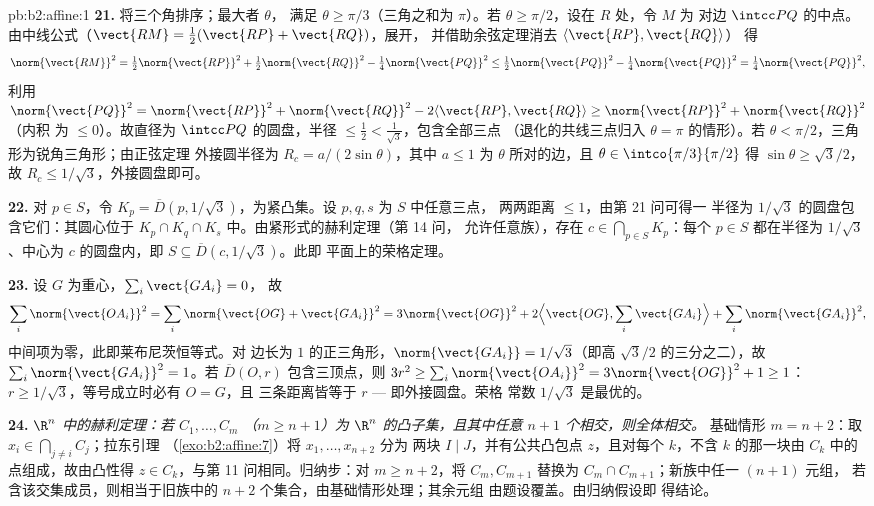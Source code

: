 \begin{solution}{pb:b2:affine:1}
\textbf{21.} 将三个角排序；最大者 $\theta$，
满足 $\theta \geq \pi/3$（三角之和为 $\pi$）。若
$\theta \geq \pi/2$，设在 $R$ 处，令 $M$ 为
对边 $\intcc PQ$ 的中点。由中线公式（$\vect{RM}
= \tfrac12(\vect{RP} + \vect{RQ})$，展开，
并借助余弦定理消去 $\langle\vect{RP}, \vect{RQ}\rangle$）
得
\[
\norm{\vect{RM}}^2 = \tfrac12\norm{\vect{RP}}^2 +
\tfrac12\norm{\vect{RQ}}^2 - \tfrac14\norm{\vect{PQ}}^2 \leq
\tfrac12\norm{\vect{PQ}}^2 - \tfrac14\norm{\vect{PQ}}^2 =
\tfrac14\norm{\vect{PQ}}^2,
\]
利用 $\norm{\vect{PQ}}^2 = \norm{\vect{RP}}^2 +
\norm{\vect{RQ}}^2 - 2\langle\vect{RP}, \vect{RQ}\rangle \geq
\norm{\vect{RP}}^2 + \norm{\vect{RQ}}^2$（内积
为 $\leq 0$）。故直径为 $\intcc PQ$ 的圆盘，半径
$\leq \tfrac12 < \tfrac1{\sqrt3}$，包含全部三点
（退化的共线三点归入 $\theta = \pi$ 的情形）。若
$\theta < \pi/2$，三角形为锐角三角形；由正弦定理
外接圆半径为 $R_c = a/(2\sin\theta)$，其中 $a \leq 1$
为 $\theta$ 所对的边，且 $\theta \in
\intco{\pi/3}{\pi/2}$ 得 $\sin\theta \geq \sqrt3/2$，故
$R_c \leq 1/\sqrt3$，外接圆盘即可。

\textbf{22.} 对 $p \in S$，令 $K_p = \overline D(p,
1/\sqrt3)$，为紧凸集。设 $p, q, s$ 为 $S$ 中任意三点，
两两距离 $\leq 1$，由第 21 问可得一
半径为 $1/\sqrt3$ 的圆盘包含它们：其圆心位于
$K_p \cap K_q \cap K_s$ 中。由紧形式的赫利定理（第 14 问，
允许任意族），存在 $c \in \bigcap_{p\in
S}K_p$：每个 $p \in S$ 都在半径为 $1/\sqrt3$、中心为 $c$ 的圆盘内，即 $S
\subseteq \overline D(c, 1/\sqrt3)$。此即
平面上的荣格定理。

\textbf{23.} 设 $G$ 为重心，$\sum_i\vect{GA_i} = 0$，
故
\[
\sum_i\norm{\vect{OA_i}}^2 = \sum_i\norm{\vect{OG} +
\vect{GA_i}}^2 = 3\norm{\vect{OG}}^2 + 2\Bigl\langle
\vect{OG}, \sum_i\vect{GA_i}\Bigr\rangle +
\sum_i\norm{\vect{GA_i}}^2,
\]
中间项为零，此即莱布尼茨恒等式。对
边长为 $1$ 的正三角形，$\norm{\vect{GA_i}} =
1/\sqrt3$（即高 $\sqrt3/2$ 的三分之二），故
$\sum_i\norm{\vect{GA_i}}^2 = 1$。若 $\overline D(O, r)$
包含三顶点，则 $3r^2 \geq
\sum_i\norm{\vect{OA_i}}^2 = 3\norm{\vect{OG}}^2 + 1 \geq 1$：
$r \geq 1/\sqrt3$，等号成立时必有 $O = G$，且
三条距离皆等于 $r$ --- 即外接圆盘。荣格
常数 $1/\sqrt3$ 是最优的。

\textbf{24.} \emph{$\R^n$ 中的赫利定理：若 $C_1, \dots, C_m$
（$m \geq n + 1$）为 $\R^n$ 的凸子集，且其中任意 $n + 1$
个相交，则全体相交。} 基础情形 $m = n +
2$：取 $x_i \in \bigcap_{j\neq i}C_j$；拉东引理
（\cref{exo:b2:affine:7}）将 $x_1, \dots, x_{n+2}$ 分为
两块 $I \mid J$，并有公共凸包点 $z$，且对每个
$k$，不含 $k$ 的那一块由
$C_k$ 中的点组成，故由凸性得 $z \in C_k$，与第
11 问相同。归纳步：对 $m \geq n + 2$，将 $C_m,
C_{m+1}$ 替换为 $C_m \cap C_{m+1}$；新族中任一 $(n+1)$ 元组，
若含该交集成员，则相当于旧族中的 $n + 2$
个集合，由基础情形处理；其余元组
由题设覆盖。由归纳假设即
得结论。


\end{solution}
